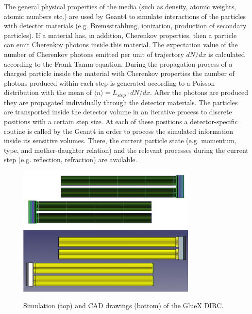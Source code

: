 \documentclass[11pt, a4paper]{article}
\begin{document}
The general physical properties of the media (such as density, atomic weights, atomic numbers etc.) are used by Geant4 to simulate interactions of the particles with detector materials (e.g. Bremsstrahlung, ionization, production of secondary particles). If a material has, in addition, Cherenkov properties, then a particle can emit Cherenkov photons inside this material. The expectation value of the number of Cherenkov photons emitted per unit of trajectory $dN/dx$ is calculated according to the Frank-Tamm equation. During the propagation process of a charged particle inside the material with Cherenkov properties the number of photons produced within each step is generated according to a Poisson distribution with the mean of $\langle n \rangle = L_{step} \cdot dN/dx$. After the photons are produced they are propagated individually through the detector materials. The particles are transported inside the detector volume in an iterative process to discrete positions with a certain step size. At each of these positions a detector-specific routine is called by the Geant4 in order to process the simulated information inside its sensitive volumes. There, the current particle state (e.g. momentum, type, and mother-daughter relation) and the relevant processes during the current step (e.g. reflection, refraction) are available.

\begin{figure}[!h]
\centering
\includegraphics[width=0.8\textwidth]{pics/bars1.png}\\
\includegraphics[width=0.8\textwidth]{pics/bars2.png}
\caption{\label{pic:dirc}
Simulation (top) and CAD drawings (bottom) of the GlueX DIRC.
}
\end{figure}  
\end{document}
